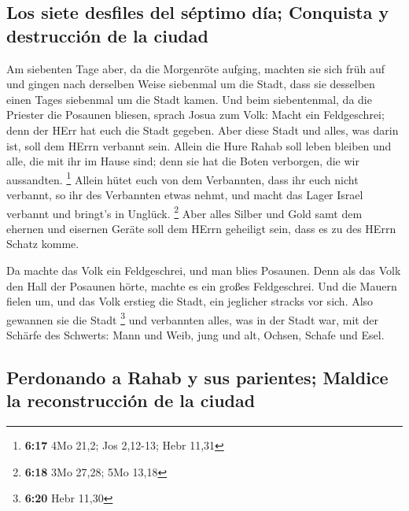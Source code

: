 \hypertarget{los-siete-desfiles-del-suxe9ptimo-duxeda-conquista-y-destrucciuxf3n-de-la-ciudad}{%
\subsection{Los siete desfiles del séptimo día; Conquista y destrucción
de la
ciudad}\label{los-siete-desfiles-del-suxe9ptimo-duxeda-conquista-y-destrucciuxf3n-de-la-ciudad}}

 Am siebenten Tage aber, da die Morgenröte aufging,
machten sie sich früh auf und gingen nach derselben Weise siebenmal um
die Stadt, dass sie desselben einen Tages siebenmal um die Stadt kamen.
 Und beim siebentenmal, da die Priester die Posaunen
bliesen, sprach Josua zum Volk: Macht ein Feldgeschrei; denn der HErr
hat euch die Stadt gegeben.  Aber diese Stadt und alles,
was darin ist, soll dem HErrn verbannt sein. Allein die Hure Rahab soll
leben bleiben und alle, die mit ihr im Hause sind; denn sie hat die
Boten verborgen, die wir aussandten. \footnote{\textbf{6:17} 4Mo 21,2;
  Jos 2,12-13; Hebr 11,31}  Allein hütet euch von dem
Verbannten, dass ihr euch nicht verbannt, so ihr des Verbannten etwas
nehmt, und macht das Lager Israel verbannt und bringt's in Unglück.
\footnote{\textbf{6:18} 3Mo 27,28; 5Mo 13,18}  Aber alles
Silber und Gold samt dem ehernen und eisernen Geräte soll dem HErrn
geheiligt sein, dass es zu des HErrn Schatz komme.

 Da machte das Volk ein Feldgeschrei, und man blies
Posaunen. Denn als das Volk den Hall der Posaunen hörte, machte es ein
großes Feldgeschrei. Und die Mauern fielen um, und das Volk erstieg die
Stadt, ein jeglicher stracks vor sich. Also gewannen sie die Stadt
\footnote{\textbf{6:20} Hebr 11,30}  und verbannten
alles, was in der Stadt war, mit der Schärfe des Schwerts: Mann und
Weib, jung und alt, Ochsen, Schafe und Esel.

\hypertarget{perdonando-a-rahab-y-sus-parientes-maldice-la-reconstrucciuxf3n-de-la-ciudad}{%
\subsection{Perdonando a Rahab y sus parientes; Maldice la
reconstrucción de la
ciudad}\label{perdonando-a-rahab-y-sus-parientes-maldice-la-reconstrucciuxf3n-de-la-ciudad}}

